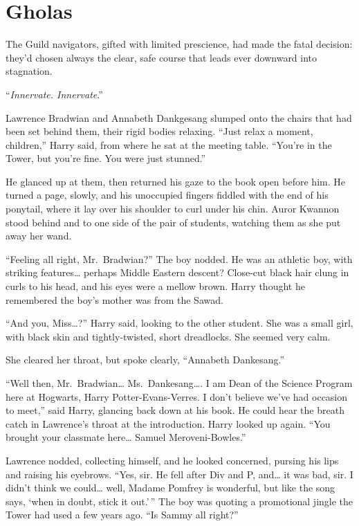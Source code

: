 \hypertarget{gholas}{%
\chapter{Gholas}\label{gholas}}

The Guild navigators, gifted with limited prescience, had made the fatal
decision: they'd chosen always the clear, safe course that leads ever
downward into stagnation.\\

\mybreak

``\emph{Innervate. Innervate}.''

Lawrence Bradwian and Annabeth Dankgesang slumped onto the chairs that
had been set behind them, their rigid bodies relaxing. ``Just relax a
moment, children,'' Harry said, from where he sat at the meeting table.
``You're in the Tower, but you're fine. You were just stunned.''

He glanced up at them, then returned his gaze to the book open before
him. He turned a page, slowly, and his unoccupied fingers fiddled with
the end of his ponytail, where it lay over his shoulder to curl under
his chin. Auror Kwannon stood behind and to one side of the pair of
students, watching them as she put away her wand.

``Feeling all right, Mr.~Bradwian?'' The boy nodded. He was an athletic
boy, with striking features\ldots{} perhaps Middle Eastern descent?
Close-cut black hair clung in curls to his head, and his eyes were a
mellow brown. Harry thought he remembered the boy's mother was from the
Sawad.

``And you, Miss\ldots?'' Harry said, looking to the other student. She
was a small girl, with black skin and tightly-twisted, short dreadlocks.
She seemed very calm.

She cleared her throat, but spoke clearly, ``Annabeth Dankesang.''

``Well then, Mr.~Bradwian\ldots{} Ms.~Dankesang\ldots. I am Dean of the
Science Program here at Hogwarts, Harry Potter-Evans-Verres. I don't
believe we've had occasion to meet,'' said Harry, glancing back down at
his book. He could hear the breath catch in Lawrence's throat at the
introduction. Harry looked up again. ``You brought your classmate
here\ldots{} Samuel Meroveni-Bowles.''

Lawrence nodded, collecting himself, and he looked concerned, pursing
his lips and raising his eyebrows. ``Yes, sir. He fell after Div and P,
and\ldots{} it was bad, sir. I didn't think we could\ldots{} well,
Madame Pomfrey is wonderful, but like the song says, `when in doubt,
stick it out.'\,'' The boy was quoting a promotional jingle the Tower
had used a few years ago. ``Is Sammy all right?''

